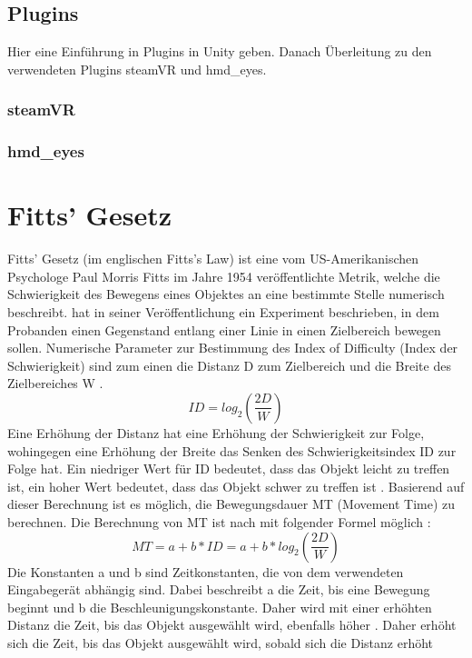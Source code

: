 \subsection{Plugins}
Hier eine Einführung in Plugins in Unity geben. Danach Überleitung zu den verwendeten Plugins steamVR und hmd\_eyes.

\subsubsection{steamVR}

\subsubsection{hmd\_eyes}


\section{Fitts' Gesetz}
Fitts' Gesetz (im englischen Fitts's Law) ist eine vom US-Amerikanischen Psychologe Paul Morris Fitts im Jahre 1954 veröffentlichte Metrik, welche die Schwierigkeit des Bewegens eines Objektes an eine bestimmte Stelle numerisch beschreibt. \citeauthor{Fitts.1992} hat in seiner Veröffentlichung ein Experiment beschrieben, in dem Probanden einen Gegenstand entlang einer Linie in einen Zielbereich bewegen sollen. Numerische Parameter zur Bestimmung des \glqq Index of Difficulty\grqq{} (Index der Schwierigkeit) sind zum einen die Distanz D zum Zielbereich und die Breite des Zielbereiches W \cite{Fitts.1992}.
\begin{equation}
ID = log_2 \left ( \frac{2D}{W} \right )
\end{equation}
Eine Erhöhung der Distanz hat eine Erhöhung der Schwierigkeit zur Folge, wohingegen eine Erhöhung der Breite das Senken des Schwierigkeitsindex ID zur Folge hat. Ein niedriger Wert für ID bedeutet, dass das Objekt leicht zu treffen ist, ein hoher Wert bedeutet, dass das Objekt schwer zu treffen ist \cite{Fitts.1992}. 
Basierend auf dieser Berechnung ist es möglich, die Bewegungsdauer MT (Movement Time) zu berechnen. Die Berechnung von MT ist nach \citeauthor{Graham.1996} mit folgender Formel möglich \cite{Graham.1996} :
\begin{equation}
MT = a + b * ID = a + b * log_2 \left ( \frac{2D}{W} \right )
\end{equation}
Die Konstanten a und b sind Zeitkonstanten, die von dem verwendeten Eingabegerät abhängig sind. Dabei beschreibt a die Zeit, bis eine Bewegung beginnt und b die Beschleunigungskonstante. Daher wird mit einer erhöhten Distanz die Zeit, bis das Objekt ausgewählt wird, ebenfalls höher \cite{Graham.1996}. {\color{red} Daher erhöht sich die Zeit, bis das Objekt ausgewählt wird, sobald sich die Distanz erhöht }

